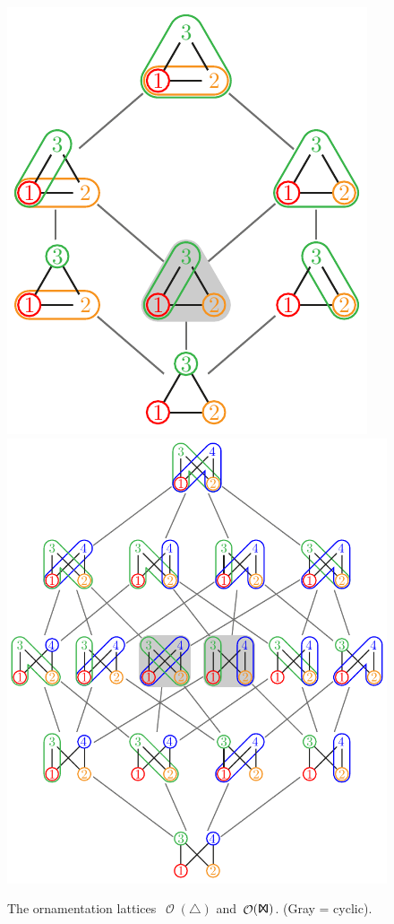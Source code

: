 \documentclass{amsart}
\theoremstyle{definition}
\renewcommand{\c}[1]{\mathcal{#1}} %
\DeclareMathOperator{\Orn}{\c{O}}  %
\newcommand{\Tgraph}{\sf I\!X\!I} %
\newcommand{\Kgraph}{\boldsymbol{\triangle}} %
\begin{document}
\begin{figure}
	\centerline{\includegraphics[scale=.68,valign=c]{ornamentationsK}\qquad\includegraphics[scale=.68,valign=c]{ornamentationsT}}
	\caption{The ornamentation lattices~$\Orn(\Kgraph)$ and~$\Orn(\Tgraph)$. (Gray = cyclic).}
	\label{fig:ornamentationsKT}
\end{figure}
\end{document}
